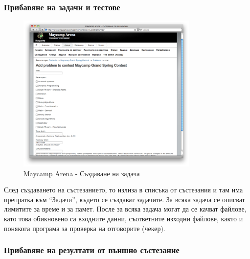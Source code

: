 \documentclass[a4paper,12pt]{article}
\begin{document}
  \pagebreak
  
  \subsubsection{Прибавяне на задачи и тестове}

  \begin{figure}[ht]
    \begin{center}
      \includegraphics[width=0.8\textwidth]{images/maycamp_arena_admin_problem.png}
    \end{center}
    \caption{Maycamp Arena - Създаване на задача}
    \label{arena_admin_problem}
  \end{figure}
  
  След създаването на състезанието, то излиза в списъка от състезания и там има препратка към ``Задачи'', където се създават задачите. За всяка задача се описват лимитите за време и за памет. После за всяка задача могат да се качват файлове, като това обикновено са входните данни, съответните изходни файлове, както и понякога програма за проверка на отговорите (чекер).
  
  \pagebreak
  
  \subsubsection{Прибавяне на резултати от външно състезание}
\end{document}
